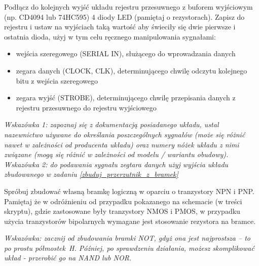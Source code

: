 \dbEntryCheckResults
Podłącz do kolejnych wyjść układu rejestru przesuwnego z buforem wyjściowym (np. CD4094 lub 74HC595) 4 diody LED (pamiętaj o rezystorach).
Zapisz do rejestru i ustaw na wyjściach taką wartość aby świeciły się dwie pierwsze i ostatnia dioda, użyj w tym celu ręcznego manipulowania sygnałami:
\begin{itemize}
\item wejścia szeregowego (SERIAL IN), służącego do wprowadzania danych
\item zegara danych (CLOCK, CLK), determinującego chwilę odczytu kolejnego bitu z wejścia szeregowego
\item zegara wyjść (STROBE), determinującego chwilę przepisania danych z rejestru przesuwnego do rejestru wyjściowego
\end{itemize}

\textit{Wskazówka 1: zapoznaj się z dokumentacją posiadanego układu, ustal nazewnictwo używane do określania poszczególnych sygnałów (może się różnić nawet w zależności od producenta układu) oraz numery nóżek układu z nimi związane (mogą się różnić w zależności od modelu / wariantu obudowy).}
\textit{Wskazówka 2: do podawania sygnału zegtara danych użyj wyjścia układu zbudowanego w zadaniu \ref{zbuduj_przerzutnik_z_bramek}}
\fi

\dbEntryCheckResults
Spróbuj zbudować własną bramkę logiczną w oparciu o tranzystory NPN i PNP. Pamiętaj że w odróżnieniu od przypadku pokazanego na schemacie (w treści skryptu), gdzie zastosowane były tranzystory NMOS i PMOS, w przypadku użycia tranzystorów bipolarnych wymagane jest stosowanie rezystora na bramce.

\textit{Wskazówka: zacznij od zbudowania bramki NOT, gdyż ona jest najprostsza – to po prostu półmostek H. Później, po sprawdzeniu działania, możesz skomplikować układ - przerobić go na NAND lub NOR.}
\fi
